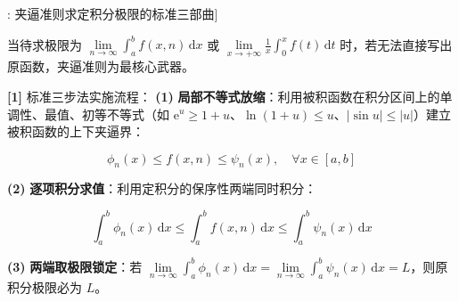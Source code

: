\documentclass[11pt,a4paper,UTF8]{ctexart}
\begin{document}
\begin{thmbox}[方法[1]: 夹逼准则求定积分极限的标准三部曲]

当待求极限为 $\lim\limits_{n\to\infty}\int_a^b f(x, n)\,\mathrm{d}x$ 或 $\lim\limits_{x\to+\infty}\frac{1}{x}\int_0^x f(t)\,\mathrm{d}t$ 时，若无法直接写出原函数，夹逼准则为最核心武器。

\textbf{[1]} 标准三步法实施流程：
\textbf{(1)}  \textbf{局部不等式放缩}：利用被积函数在积分区间上的单调性、最值、初等不等式（如 $\mathrm{e}^u \geqslant 1+u$、$\ln(1+u) \leqslant u$、$|\sin u| \leqslant |u|$）建立被积函数的上下夹逼界：


\begin{equation*}
\phi_n(x) \leqslant f(x, n) \leqslant \psi_n(x), \quad \forall x \in [a, b]
\end{equation*}


\textbf{(2)}  \textbf{逐项积分求值}：利用定积分的保序性两端同时积分：


\begin{equation*}
\int_a^b \phi_n(x)\,\mathrm{d}x \leqslant \int_a^b f(x, n)\,\mathrm{d}x \leqslant \int_a^b \psi_n(x)\,\mathrm{d}x
\end{equation*}


\textbf{(3)}  \textbf{两端取极限锁定}：若 $\lim\limits_{n\to\infty}\int_a^b \phi_n(x)\,\mathrm{d}x = \lim\limits_{n\to\infty}\int_a^b \psi_n(x)\,\mathrm{d}x = L$，则原积分极限必为 $L$。

\end{thmbox}
\end{document}
